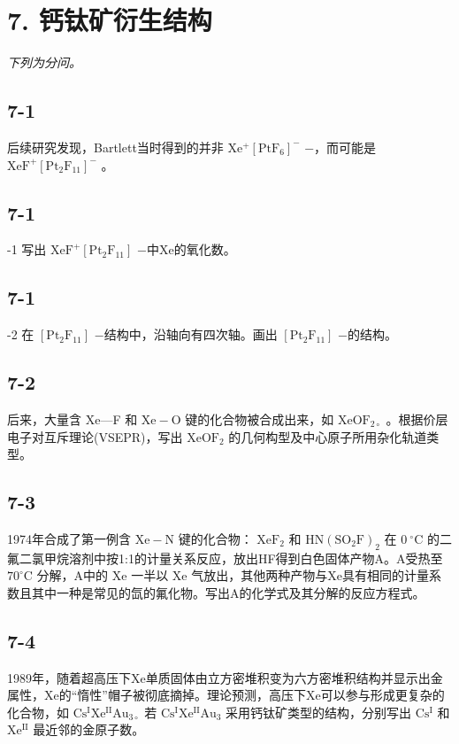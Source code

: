 \section*{7. 钙钛矿衍生结构}
\textit{下列为分问。}

\subsection*{7-1}
后续研究发现，Bartlett当时得到的并⾮ $\mathrm { X e ^ { + } [ P t F _ { 6 } ] ^ { - } }$ −，⽽可能是 $\mathrm { X e F ^ { + } [ P t _ { 2 } F _ { 1 1 } ] ^ { - } }$ 。

\subsection*{7-1}
-1 写出 $\mathrm { X e F ^ { + } [ P t _ { 2 } F _ { 1 1 } ] }$ −中Xe的氧化数。

\subsection*{7-1}
-2 在 $\mathrm { [ P t _ { 2 } F _ { 1 1 } ] }$ −结构中，沿轴向有四次轴。画出 $\mathrm { [ P t _ { 2 } F _ { 1 1 } ] }$ −的结构。

\subsection*{7-2}
后来，⼤量含 Xe—F 和 $\mathrm { X e - O }$ 键的化合物被合成出来，如 $\mathrm { X e O F _ { 2 \circ } }$ 。根据价层电⼦对互斥理论(VSEPR)，写出 $\mathrm { X e O F _ { 2 } }$ 的⼏何构型及中⼼原⼦所⽤杂化轨道类型。

\subsection*{7-3}
1974年合成了第⼀例含 $\mathrm { X e - N }$ 键的化合物： $\mathrm { X e F _ { 2 } }$ 和 $\mathrm { H N } ( \mathrm { S O _ { 2 } F } ) _ { 2 }$ 在 $0 ~ ^ { \circ } \mathrm { C }$ 的⼆氟⼆氯甲烷溶剂中按1:1的计量关系反应，放出HF得到⽩⾊固体产物A。A受热⾄ $7 0 ^ { \circ } \mathrm { C }$ 分解，A中的 $\mathrm { X e }$ ⼀半以 $\mathrm { X e }$ ⽓放出，其他两种产物与Xe具有相同的计量系数且其中⼀种是常⻅的氙的氟化物。写出A的化学式及其分解的反应⽅程式。

\subsection*{7-4}
1989年，随着超⾼压下Xe单质固体由⽴⽅密堆积变为六⽅密堆积结构并显⽰出⾦属性，Xe的“惰性”帽⼦被彻底摘掉。理论预测，⾼压下Xe可以参与形成更复杂的化合物，如 $\mathrm { C s ^ { I } X e ^ { I I } A u _ { 3 \circ } }$ 若 $\mathrm { C s ^ { I } X e ^ { I I } A u _ { 3 } }$ 采⽤钙钛矿类型的结构，分别写出 $\mathrm { C s ^ { I } }$ 和 $\mathrm { X e ^ { I I } }$ 最近邻的⾦原⼦数。
